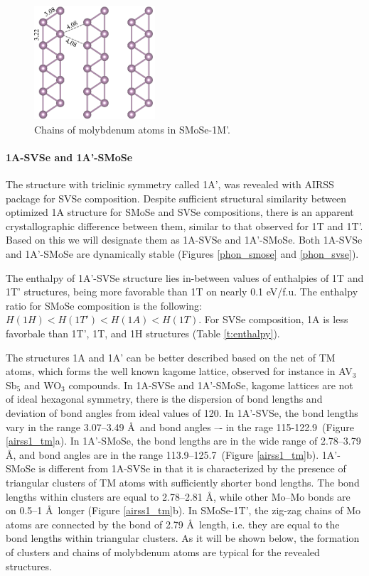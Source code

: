 \documentclass[a4paperm]{article}
\begin{document}
\begin{figure}[H]
	\includegraphics[width=0.4\textwidth]{H-hor_Mo.png}
	\caption{Chains of molybdenum atoms in SMoSe-1M'.}
	\label{H-hor_Mo}
\end{figure} 


\paragraph{1A-SVSe and 1A'-SMoSe}
The structure with triclinic symmetry called 1A', was revealed with AIRSS package for SVSe composition.
Despite sufficient structural similarity between optimized 1A structure for SMoSe and SVSe compositions, there is an apparent crystallographic difference between them, similar to that observed for 1T and 1T'.
Based on this we will designate them as 1A-SVSe and 1A'-SMoSe.
Both 1A-SVSe and 1A'-SMoSe are dynamically stable (Figures \ref{phon_smose} and \ref{phon_svse}).

The enthalpy of 1A'-SVSe structure lies in-between values of enthalpies of 1T and 1T' structures, being more favorable than 1T on nearly 0.1 eV/f.u.
The enthalpy ratio for SMoSe composition is the following: 
$H(1H) < H(1T') < H(1A) < H (1T)$.
For SVSe composition, 1A is less favorbale than 1T', 1T, and 1H structures (Table \ref{t:enthalpy}).


The structures 1A and 1A' can be better described based on the net of TM atoms, which forms the well known kagome lattice\cite{zhang2021_kagome}, observed for instance in AV$_3$Sb$_5$ \cite{ortiz2021} and WO$_3$ \cite{gerand1979} compounds.
In 1A-SVSe and 1A'-SMoSe, kagome lattices are not of ideal hexagonal symmetry, there is the dispersion of bond lengths and deviation of bond angles from ideal values of 120\textdegree.
In 1A'-SVSe, the bond lengths vary in the range 3.07--3.49 \AA\ and bond angles –- in the rage 115-122.9\textdegree\ (Figure \ref{airss1_tm}a).
In 1A'-SMoSe, the bond lengths are in the wide range of 2.78--3.79 \AA, and bond angles are in the range 113.9--125.7\textdegree\ (Figure \ref{airss1_tm}b).
1A'-SMoSe is different from 1A-SVSe in that it is characterized by the presence of triangular clusters of TM atoms with sufficiently shorter bond lengths.
The bond lengths within clusters are equal to 2.78--2.81 \AA, while other Mo--Mo bonds are on 0.5--1 \AA\ longer (Figure \ref{airss1_tm}b).
In SMoSe-1T', the zig-zag chains of Mo atoms are connected by the bond of 2.79 \AA\ length, i.e. they are equal to the bond lengths within triangular clusters.
As it will be shown below, the formation of clusters and chains of molybdenum atoms are typical for the revealed structures.
\end{document}
